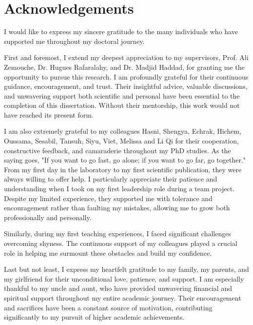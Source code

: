 \chapter{Acknowledgements}

I would like to express my sincere gratitude to the many individuals who have supported me throughout my doctoral journey.

First and foremost, I extend my deepest appreciation to my supervisors, Prof. Ali Zemouche, Dr. Hugues Rafaralahy, and Dr. Madjid Haddad, for granting me the opportunity to pursue this research. 
I am profoundly grateful for their continuous guidance, encouragement, and trust. 
Their insightful advice, valuable discussions, and unwavering support both scientific and personal have been essential to the completion of this dissertation. Without their mentorship, this work would not have reached its present form.

I am also extremely grateful to my colleagues Hasni, Shengya, Echrak, Hichem, Oussama, Sesabil, Tansuh, Siyu, Viet, Melissa and Li Qi for their cooperation, constructive feedback, and camaraderie throughout my PhD studies. As the saying goes, "If you want to go fast, go alone; if you want to go far, go together." From my first day in the laboratory to my first scientific publication, they were always willing to offer help. I particularly appreciate their patience and understanding when I took on my first leadership role during a team project. Despite my limited experience, they supported me with tolerance and encouragement rather than faulting my mistakes, allowing me to grow both professionally and personally.

Similarly, during my first teaching experiences, I faced significant challenges overcoming shyness. The continuous support of my colleagues played a crucial role in helping me surmount these obstacles and build my confidence.

Last but not least, I express my heartfelt gratitude to my family, my parents, and my girlfriend for their unconditional love, patience, and support. I am especially thankful to my uncle and aunt, who have provided unwavering financial and spiritual support throughout my entire academic journey. Their encouragement and sacrifices have been a constant source of motivation, contributing significantly to my pursuit of higher academic achievements.